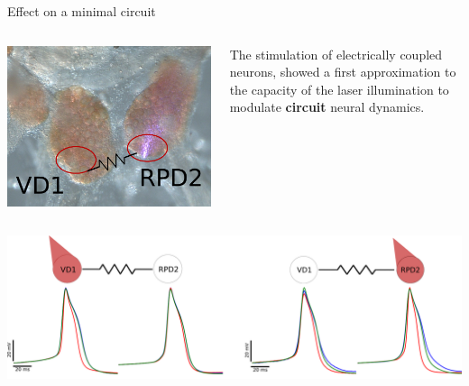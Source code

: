 \documentclass[aspectratio=43]{beamer}
\begin{document}
\begin{frame}{Effect on a minimal circuit}
	
	\begin{columns}
		\begin{column}{0.3\textwidth}
			\includegraphics[width=\textwidth]{Images/electrical_ganglia.png}
		\end{column}
	\vspace{15pt}
		\begin{column}{0.7\textwidth}
			The stimulation of electrically coupled neurons, showed a first approximation to the capacity of the laser illumination to modulate \textbf{circuit} neural dynamics. 
		\end{column}
	\end{columns}
	\vspace{10pt}
	\centering
	\includegraphics[width=\textwidth]{Images/electrical_result.png}	
	\small{}
\end{frame}
\end{document}
